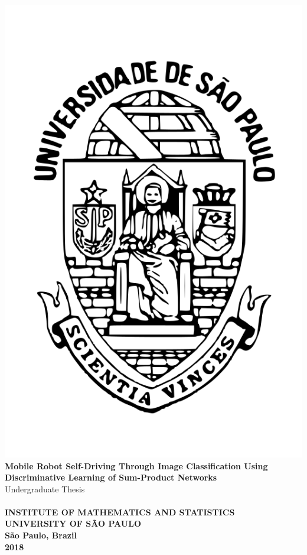 \thispagestyle{empty}
\begin{center}
  \vspace{-3.0cm}
  {\includegraphics[scale=0.2]{imgs/logo-usp.png}}\\
  {\textbf{\LARGE Mobile Robot Self-Driving Through Image Classification Using
        Discriminative Learning of Sum-Product Networks}}\\
  \vspace{2.0cm}
  \Large Undergraduate Thesis\\
  \vspace{2.5cm}
  \large{}\\
  \vspace{2.5cm}
  \centering
  {\textbf{\uppercase{Institute of Mathematics and Statistics\\University of São Paulo}}}\\
  \vspace{1.5cm}
  {\Large\textbf{São Paulo, Brazil}}\\
  \vspace{0.25cm}
  {\Large\textbf{2018}}\\
\end{center}

